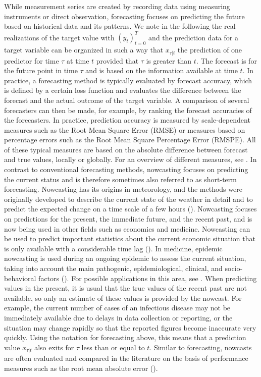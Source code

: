 While measurement series are created by recording data using measuring instruments or direct observation, forecasting focuses on predicting the future based on historical data and its patterns. We note in the following the real realizations of the target value with $(y_t)^T_{t=0}$ and the prediction data for a target variable can be organized in such a way that $x_{\tau|t}$ the prediction of one predictor for time $\tau$ at time $t$ provided that $\tau$ is greater than $t$. The forecast is for the future point in time $\tau$ and is based on the information available at time $t$. 
In practice, a forecasting method is typically evaluated by forecast accuracy, which is defined by a certain loss function and evaluates the difference between the forecast and the actual outcome of the target variable.
A comparison of several forecasters can then be made, for example, by ranking the forecast accuracies of the forecasters.
In practice, prediction accuracy is measured by scale-dependent measures such as the Root Mean Square Error (RMSE) or measures based on percentage errors such as the Root Mean Square Percentage Error (RMSPE). All of these typical measures are based on the absolute difference between forecast and true values, locally or globally. For an overview of different measures, see \cite{hyndman2006another}. 
In contrast to conventional forecasting methods, nowcasting focuses on predicting the current status and is therefore sometimes also referred to as short-term forecasting.  Nowcasting has its origins in meteorology, and the methods were originally developed to describe the current state of the weather in detail and to predict the expected change on a time scale of a few hours (\cite{browning1989nowcasting,schmid2019nowcasting}).
Nowcasting focuses on predictions for the present, the immediate future, and the recent past, and is now being used in other fields such as economics and medicine. Nowcasting can be used to predict important statistics about the current economic situation that is only available with a considerable time lag (\cite{banbura2013now, giannone2006nowcasting,fornaro2020nowcasting,bok2018macroeconomic}). In medicine, epidemic nowcasting is used during an ongoing epidemic to assess the current situation, taking into account the main pathogenic, epidemiological, clinical, and socio-behavioral factors (\cite{wu2021nowcasting}). For possible applications in this area, see \cite{johansson2014nowcasting,gunther2021nowcasting,birrell2021real}.
When predicting values in the present, it is usual that the true values of the recent past are not available, so only an estimate of these values is provided by the nowcast. For example, the current number of cases of an infectious disease may not be immediately available due to delays in data collection or reporting, or the situation may change rapidly so that the reported figures become inaccurate very quickly.
Using the notation for forecasting above, this means that a prediction value $x_{\tau|t}$ also exits for $\tau$ less than or equal to $t$.
Similar to forecasting, nowcasts are often evaluated and compared in the literature on the basis of performance measures such as the root mean absolute error (\cite{gunther2021nowcasting}).

